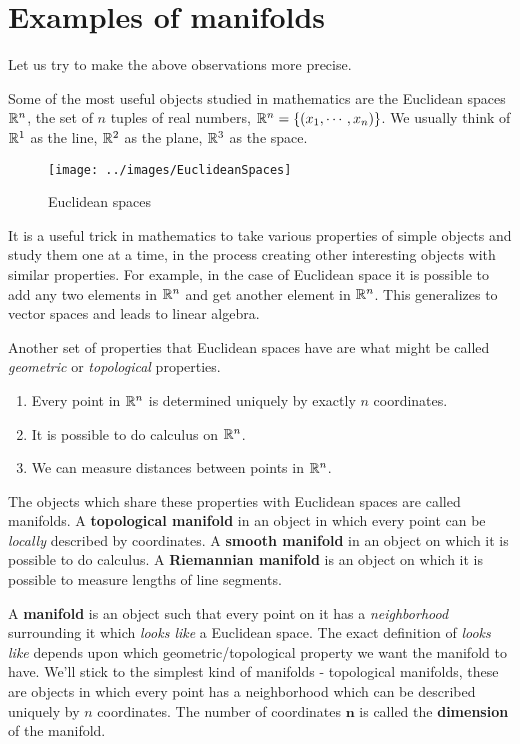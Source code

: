 \section{Examples of manifolds}
Let us try to make the above observations more precise.

Some of the most useful objects studied in mathematics are the Euclidean spaces $\mathbb{R}^n$, the set of $n$ tuples of real numbers, $\mathbb{R}^n = \{ (x_1, \cdots, x_n) \}$. We usually think of $\mathbb{R}^1$ as the line, $\mathbb{R}^2$ as the plane, $\mathbb{R}^3$ as the space.
\begin{figure}[H]
	\centering \texttt{[image: ../images/EuclideanSpaces]}
	\caption{Euclidean spaces}
\end{figure}

It is a useful trick in mathematics to take various properties of simple objects and study them one at a time, in the process creating other interesting objects with similar properties. For example, in the case of Euclidean space it is possible to add any two elements in $\mathbb{R}^n$ and get another element in $\mathbb{R}^n$. This generalizes to {vector spaces} and leads to {linear algebra}.

Another set of properties that Euclidean spaces have are what might be called \emph{geometric} or \emph{topological} properties.
\begin{enumerate}
	\item Every point in $\mathbb{R}^n$ is determined uniquely by exactly $n$ {coordinates}.
	\item It is possible to do calculus on $\mathbb{R}^n$.
	\item We can measure distances between points in $\mathbb{R}^n$.
\end{enumerate}
The objects which share these properties with Euclidean spaces are called manifolds. A \textbf{topological manifold} in an object in which every point can be \emph{locally} described by coordinates. A \textbf{smooth manifold} in an object on which it is possible to do calculus. A \textbf{Riemannian manifold} is an object on which it is possible to measure lengths of line segments.

A \textbf{manifold} is an object such that every point on it has a \emph{neighborhood} surrounding it which \emph{looks like} a Euclidean space. The exact definition of \emph{looks like} depends upon which geometric/topological property we want the manifold to have. We'll stick to the simplest kind of manifolds - topological manifolds, these are objects in which every point has a neighborhood which can be described uniquely by $n$ coordinates. The number of coordinates $\mathbf{n}$ is called the \textbf{dimension} of the manifold.

